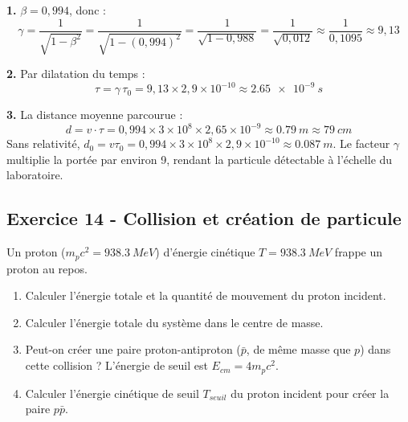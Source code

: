 \documentclass[12pt,a4paper]{article}
\begin{document}
\begin{boitecorrige}
\textbf{1.} $\beta = 0{,}994$, donc :
\[
\gamma = \frac{1}{\sqrt{1-\beta^2}} = \frac{1}{\sqrt{1-(0{,}994)^2}} = \frac{1}{\sqrt{1-0{,}988}} = \frac{1}{\sqrt{0{,}012}} \approx \frac{1}{0{,}1095} \approx 9{,}13
\]

\textbf{2.} Par dilatation du temps :
\[
\tau = \gamma\,\tau_0 = 9{,}13\times2{,}9\times10^{-10} \approx \qty{2.65e-9}{s}
\]

\textbf{3.} La distance moyenne parcourue :
\[
d = v\cdot\tau = 0{,}994\times3\times10^8\times2{,}65\times10^{-9} \approx \qty{0.79}{m} \approx \qty{79}{cm}
\]
Sans relativité, $d_0 = v\tau_0 = 0{,}994\times3\times10^8\times2{,}9\times10^{-10}\approx\qty{0.087}{m}$. Le facteur $\gamma$ multiplie la portée par environ 9, rendant la particule détectable à l'échelle du laboratoire.
\end{boitecorrige}

\subsection*{Exercice 14 - Collision et création de particule \niveau{\difficile}}

\begin{boiteexercice}
Un proton ($m_p c^2 = \qty{938.3}{MeV}$) d'énergie cinétique $T = \qty{938.3}{MeV}$ frappe un proton au repos.
\begin{enumerate}
  \item Calculer l'énergie totale et la quantité de mouvement du proton incident.
  \item Calculer l'énergie totale du système dans le centre de masse.
  \item Peut-on créer une paire proton-antiproton ($\bar{p}$, de même masse que $p$) dans cette collision ? L'énergie de seuil est $E_{cm} = 4m_pc^2$.
  \item Calculer l'énergie cinétique de seuil $T_{seuil}$ du proton incident pour créer la paire $p\bar{p}$.
\end{enumerate}
\end{boiteexercice}
\end{document}
